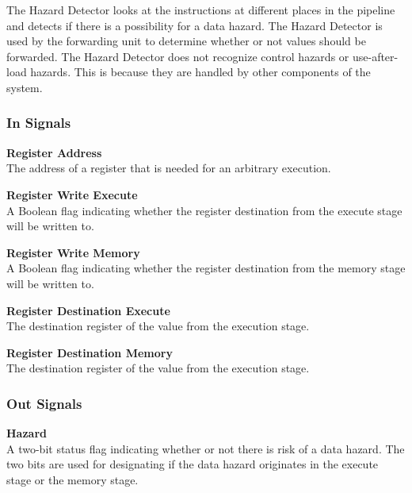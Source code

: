 The Hazard Detector looks at the instructions at different places in the pipeline and detects if there is a possibility for a data hazard.
The Hazard Detector is used by the forwarding unit to determine whether or not values should be forwarded.
The Hazard Detector does not recognize control hazards or use-after-load hazards.
This is because they are handled by other components of the system.

\subsubsection{In Signals}

\begin{description}
\item{\textbf{Register Address}} \\
    The address of a register that is needed for an arbitrary execution.

\item{\textbf{Register Write Execute}} \\
    A Boolean flag indicating whether the register destination from the execute stage will be written to.

\item{\textbf{Register Write Memory}} \\
    A Boolean flag indicating whether the register destination from the memory stage will be written to.

\item{\textbf{Register Destination Execute}} \\
    The destination register of the value from the execution stage.
\item{\textbf{Register Destination Memory}} \\
    The destination register of the value from the execution stage.

\end{description}

\subsubsection{Out Signals}

\begin{description}
\item{\textbf{Hazard}} \\
    A two-bit status flag indicating whether or not there is risk of a data hazard. The two bits are used for designating if the data hazard originates in the execute stage or the memory stage.
\end{description}
